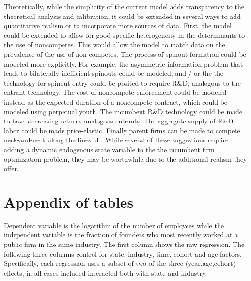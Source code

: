 \documentclass[11pt,english]{article}
\begin{document}
Theoretically, while the simplicity of the current model adds transparency to the theoretical analysis and calibration, it could be extended in several ways to add quantitative realism or to incorporate more sources of data. First, the model could be extended to allow for good-specific heterogeneity in the determinants to the use of noncompetes. This would allow the model to match data on the prevalence of the use of non-competes. The process of spinout formation could be modeled more explicitly. For example, the asymmetric information problem that leads to bilaterally inefficient spinouts could be modeled, and / or the the technology for spinout entry could be posited to require R\&D, analogous to the entrant technology. The cost of noncompete enforcement could be modeled instead as the expected duration of a noncompete contract, which could be modeled using perpetual youth. The incumbent R\&D technology could be made to have decreasing returns analogous entrants. The aggregate supply of R\&D labor could be made price-elastic. Finally parent firms can be made to compete neck-and-neck along the lines of \cite{aghion_competition_2005}. While several of these suggestions require adding a dynamic endogenous state variable to the the incumbent firm optimization problem, they may be worthwhile due to the additional realism they offer.
 



\appendix


\newpage
\section{Appendix of tables}

\setcounter{table}{0}
\renewcommand{\thetable}{\Alph{section}\arabic{table}}





\begin{table}[!htb]
	\scriptsize
	\centering
	
	\caption{Dependent variable is the logarithm of the number of employees while the independent variable is the fraction of founders who most recently worked at a public firm in the same industry. The first column shows the raw regression. The following three columns control for state, industry, time, cohort and age factors. Specifically, each regression uses a subset of two of the three (year,age,cohort) effects, in all cases included interacted both with state and industry.} 
	\label{table:startupLifeCycle_founder2founders_lemployeecount_founder2}
\end{table}
\end{document}
